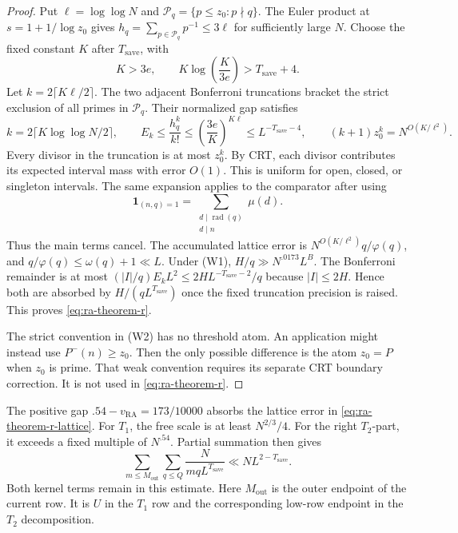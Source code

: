 \begin{proof}
Put \(\ell=\log\log N\) and
\(\mathcal P_q=\{p\le z_0:p\nmid q\}\). The Euler product at
\(s=1+1/\log z_0\) gives
\(h_q=\sum_{p\in\mathcal P_q}p^{-1}\le3\ell\) for sufficiently large
\(N\). Choose the fixed constant \(K\) after \(T_{\mathrm{save}}\), with
\begin{equation}\label{eq:ra-bonferroni-constant}
 K>3e,\qquad K\log\!\left(\frac K{3e}\right)>T_{\mathrm{save}}+4.
\end{equation}
Let \(k=2\lceil K\ell/2\rceil\). The two adjacent Bonferroni truncations
bracket the strict exclusion of all primes in \(\mathcal P_q\).
Their normalized gap satisfies
\begin{equation}\label{eq:ra-theorem-r-lattice}
 k=2\lceil K\log\log N/2\rceil,\qquad
 E_k\le\frac{h_q^k}{k!}
       \le\left(\frac{3e}{K}\right)^{K\ell}
       \le L^{-T_{\mathrm{save}}-4},\qquad
 (k+1)z_0^k=N^{O(K/\ell^2)}.
\end{equation}
Every divisor in the truncation is at most \(z_0^k\).
By CRT, each divisor
contributes its expected interval mass with error \(O(1)\).
This is uniform for open, closed, or singleton intervals.
The same expansion applies to the comparator after using
\[
 \mathbf1_{(n,q)=1}=\sum_{\substack{d\mid\operatorname{rad}(q)\\d\mid n}}\mu(d).
\]
Thus the main terms cancel. The accumulated lattice error is
\(N^{O(K/\ell^2)}q/\varphi(q)\), and
\(q/\varphi(q)\le\omega(q)+1\ll L\). Under (W1),
\(H/q\gg N^{.0173}L^B\). The Bonferroni remainder is at
most \((|I|/q)E_kL^2\le2HL^{-T_{\mathrm{save}}-2}/q\) because \(|I|\le2H\). Hence both are
absorbed by \(H/(qL^{T_{\mathrm{save}}})\) once the fixed truncation precision is raised. This proves \eqref{eq:ra-theorem-r}.

The strict convention in (W2) has no threshold atom.
An application might instead use \(P^-(n)\ge z_0\).
Then the only possible difference is the atom
\(z_0=P\) when \(z_0\) is prime. That weak convention requires its separate
CRT boundary correction. It is not used in \eqref{eq:ra-theorem-r}.
\end{proof}
The positive gap \(.54-v_{\mathrm{RA}}=173/10000\) absorbs the lattice error
in \eqref{eq:ra-theorem-r-lattice}.
For \(T_1\), the free scale is at least \(N^{2/3}/4\).
For the right \(T_2\)-part, it exceeds a fixed multiple of \(N^{.54}\).
Partial summation then gives
\begin{equation}\label{eq:ra-direct-row-total}
 \sum_{m\le M_{\mathrm{out}}}\sum_{q\le Q}\frac{N}{mqL^{T_{\mathrm{save}}}}
 \ll NL^{2-T_{\mathrm{save}}}.
\end{equation}
Both kernel terms remain in this estimate.
Here \(M_{\mathrm{out}}\) is the outer endpoint of the current row.
It is \(U\) in the \(T_1\) row and the
corresponding low-row endpoint in the \(T_2\) decomposition.


